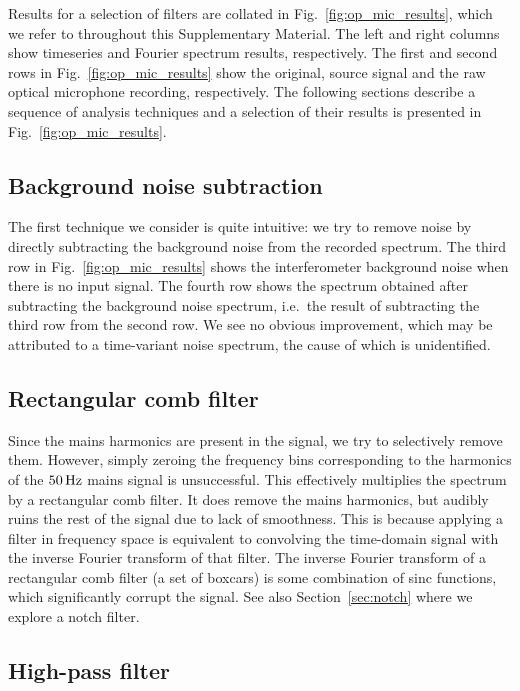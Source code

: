 \documentclass[aps,pra,superscriptaddress,reprint]{revtex4-2}
\begin{document}
Results for a selection of filters are collated in Fig.~\ref{fig:op_mic_results}, which we refer to throughout this Supplementary Material. 
The left and right columns show timeseries and Fourier spectrum results, respectively. 
The first and second rows in Fig.~\ref{fig:op_mic_results} show the original, source signal and the raw optical microphone recording, respectively. 
The following sections describe a sequence of analysis techniques and a selection of their results is presented in Fig.~\ref{fig:op_mic_results}.



\subsection{Background noise subtraction}

The first technique we consider is quite intuitive: we try to remove noise by directly subtracting the background noise from the recorded spectrum. 
The third row in Fig.~\ref{fig:op_mic_results} shows the interferometer background noise when there is no input signal.
The fourth row shows the spectrum obtained after subtracting the background noise spectrum, i.e.\ the result of subtracting the third row from the second row. 
We see no obvious improvement, which may be attributed to a time-variant noise spectrum, the cause of which is unidentified. 



\subsection{Rectangular comb filter}

Since the mains harmonics are present in the signal, we try to selectively remove them.
However, simply zeroing the frequency bins corresponding to the harmonics of the $50\,{\rm Hz}$ mains signal is unsuccessful. 
This effectively multiplies the spectrum by a rectangular comb filter. 
It does remove the mains harmonics, but audibly ruins the rest of the signal due to lack of smoothness. 
This is because applying a filter in frequency space is equivalent to convolving the time-domain signal with the inverse Fourier transform of that filter. 
The inverse Fourier transform of a rectangular comb filter (a set of boxcars) is some combination of sinc functions, which significantly corrupt the signal. 
See also Section~\ref{sec:notch} where we explore a notch filter. 



\subsection{High-pass filter}
\end{document}
